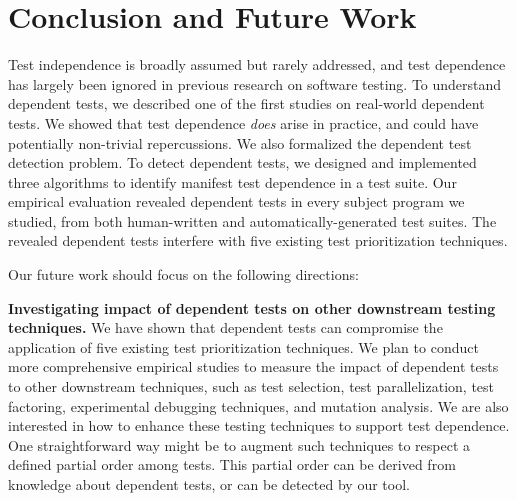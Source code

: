 
\vspace{-1mm}
\section{Conclusion and Future Work}
\label{sec:questions}


Test independence is broadly assumed but rarely addressed, and
test dependence has largely been ignored in previous
research on software testing. 
To understand dependent tests, we described one of the first studies on
real-world dependent tests. We showed that 
test dependence \textit{does} arise in practice, and could 
have potentially non-trivial repercussions. We also
formalized the dependent test detection
problem. To detect dependent tests, we designed
and implemented three algorithms to identify manifest test dependence
in a test suite. Our empirical evaluation revealed
dependent tests in every subject program
we studied, from both human-written and automatically-generated test
suites. The revealed dependent tests interfere with
five existing test prioritization techniques.

Our future work should focus on the following directions:

\vspace{1mm}

\noindent \textbf{{Investigating impact of dependent tests
on other downstream testing techniques.}}
We have shown that dependent tests can compromise the application of
five existing test prioritization techniques.
We plan to conduct more comprehensive empirical studies to
measure the impact of dependent tests to other
downstream techniques, such as test selection,
test parallelization, test factoring, experimental
debugging techniques, and mutation analysis.
We are also interested in how to enhance these
testing techniques to support test dependence.
%
One straightforward way 
might be to augment such techniques to respect a
defined partial order among tests. This partial order
can be derived from knowledge about dependent tests,
or can be detected by our \ourtool tool.



\vspace{1mm}


